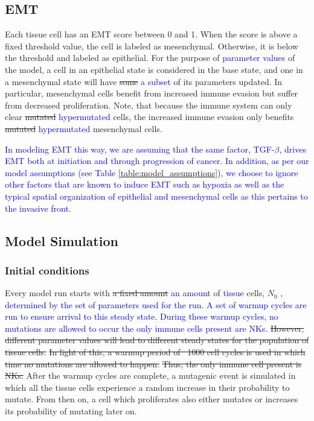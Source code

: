 \documentclass[11pt]{article}
\newcommand{\tcb} { \textcolor{blue} }
\begin{document}
\subsection{EMT}\label{EMT}
Each tissue cell has an EMT score between 0 and 1.
When the score is above a fixed threshold value, the cell is labeled as mesenchymal.
Otherwise, it is below the threshold and labeled as epithelial.
For the purpose of \tcb{parameter values} of the model, a cell in an epithelial state is considered in the base state, and one in a mesenchymal state will have \sout{some} \tcb{a subset} of its parameters updated.
In particular, mesenchymal cells benefit from increased immune evasion but suffer from decreased proliferation.
Note, that because the immune system can only clear \sout{mutated} \tcb{hypermutated} cells, the increased immune evasion only benefits \sout{mutated} \tcb{hypermutated} mesenchymal cells.
\par
\tcb{
In modeling EMT this way, we are assuming that the same factor, TGF-$\beta$, drives EMT both at initiation and through progression of cancer.
In addition, as per our model assumptions (see Table \ref{table:model_assumptions}), we choose to ignore other factors that are known to induce EMT such as hypoxia as well as the typical spatial organization of epithelial and mesenchymal cells as this pertains to the invasive front.
}
\subsection{Model Simulation}

\subsubsection{Initial conditions} 
Every model run starts with \sout{a fixed amount} \tcb{an amount} of \tcb{tissue} cells, $N_0$ \tcb{, determined by the set of parameters used for the run.
A set of warmup cycles are run to ensure arrival to this steady state.
During these warmup cycles, no mutations are allowed to occur the only immune cells present are NKs.}
\sout{However, different parameter values will lead to different steady states for the population of tissue cells.}
\sout{In light of this, a warmup period of ~1000 cell cycles is used in which time no mutations are allowed to happen.}
\sout{Thus, the only immune cell present is NKs.}
After the warmup cycles are complete, a mutagenic event is simulated in which all the tissue cells experience a random increase in their probability to mutate.
From then on, a cell which proliferates also either mutates or increases its probability of mutating later on.
\end{document}
